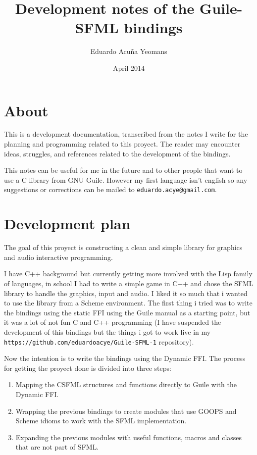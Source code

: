 \documentclass[latterpaper, leqno]{article}
\title{Development notes of the Guile-SFML bindings}
\author{Eduardo Acuña Yeomans}
\date{April 2014}
\begin{document}
\maketitle

\section*{About}
This is a development documentation, transcribed from the notes I write for the planning and programming related to this proyect. The reader may encounter ideas, struggles, and references related to the development of the bindings.

This notes can be useful for me in the future and to other people that want to use a C library from GNU Guile. However my first language isn't english so any suggestions or corrections can be mailed to \texttt{eduardo.acye@gmail.com}.

\section*{Development plan}
The goal of this proyect is constructing a clean and simple library for graphics and audio interactive programming.

I have C++ background but currently getting more involved with the Lisp family of languages, in school I had to write a simple game in C++ and chose the SFML library to handle the graphics, input and audio. I liked it so much that i wanted to use the library from a Scheme environment. The first thing i tried was to write the bindings using the static FFI using the Guile manual as a starting point, but it was a lot of not fun C and C++ programming (I have suspended the development of this bindings but the things i got to work live in my \texttt{https://github.com/eduardoacye/Guile-SFML-1} repository).

Now the intention is to write the bindings using the Dynamic FFI. The process for getting the proyect done is divided into three steps:

\begin{enumerate}
\item Mapping the CSFML structures and functions directly to Guile with the Dynamic FFI.
\item Wrapping the previous bindings to create modules that use GOOPS and Scheme idioms to work with the SFML implementation.
\item Expanding the previous modules with useful functions, macros and classes that are not part of SFML.
\end{enumerate}
\end{document}
